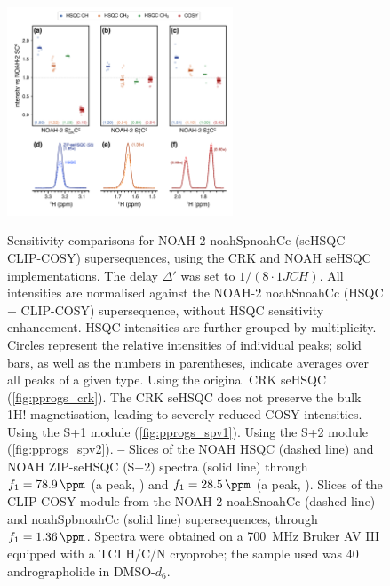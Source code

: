\documentclass[11pt]{article}
\newcommand*{\noahtwo}[2]{\csname noah#1\endcsname\csname noah#2\endcsname}
\newcommand*{\noahSpa}{S+1}
\newcommand*{\noahSpb}{S+2}
\newcommand*{\onejch}{1JCH}
\newcommand*{\magnnot}[1]{1H!#1}
\newcommand*{\andro}{Spectra were obtained on a \SI{700}{\MHz} Bruker AV III equipped with a TCI H/C/N cryoprobe; the sample used was \SI{40}{\milli\molar} andrographolide in DMSO-$d_6$.}
\begin{document}
\begin{refsection}
\begin{figure}
    \centering
    \includegraphics[width=0.6\textwidth]{sehsqc_comp.png}
    {\label{fig:sehsqc_comp_crk}}
    {\label{fig:sehsqc_comp_spv1}}
    {\label{fig:sehsqc_comp_spv2}}
    {\label{fig:sehsqc_comp_ex_ch}}
    {\label{fig:sehsqc_comp_ex_ch2}}
    {\label{fig:sehsqc_comp_ex_cosy}}
    \caption{
        Sensitivity comparisons for NOAH-2 \noahtwo{Sp}{Cc} (seHSQC + CLIP-COSY) supersequences, using the CRK and NOAH seHSQC implementations.
        The delay $\Delta'$ was set to $1/(8\cdot\onejch)$.
        All intensities are normalised against the NOAH-2 \noahtwo{S}{Cc} (HSQC + CLIP-COSY) supersequence, without HSQC sensitivity enhancement.
        HSQC intensities are further grouped by multiplicity.
        Circles represent the relative intensities of individual peaks; solid bars, as well as the numbers in parentheses, indicate averages over all peaks of a given type.
        \textbf{} Using the original CRK seHSQC (\cref{fig:pprogs_crk}).
        The CRK seHSQC does not preserve the bulk \magnnot{} magnetisation, leading to severely reduced COSY intensities.
        \textbf{} Using the \noahSpa{} module (\cref{fig:pprogs_spv1}).
        \textbf{} Using the \noahSpb{} module (\cref{fig:pprogs_spv2}).
        \textbf{--} Slices of the NOAH HSQC (dashed line) and NOAH ZIP-seHSQC (\noahSpb{}) spectra (solid line) through $f_1 = \SI{78.9}{\ppm}$ (a  peak, ) and $f_1 = \SI{28.5}{\ppm}$ (a  peak, ).
        \textbf{} Slices of the CLIP-COSY module from the NOAH-2 \noahtwo{S}{Cc} (dashed line) and \noahtwo{Spb}{Cc} (solid line) supersequences, through $f_1 = \SI{1.36}{\ppm}$.
        \andro{}
    }
    \label{fig:sehsqc_comp}
\end{figure}


\end{refsection}
\end{document}
